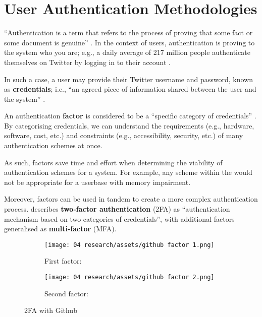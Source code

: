 \section{User Authentication Methodologies}

\enquote{Authentication is a term that refers to the
  process of proving that some fact or some document is
  genuine} \parencite{whatIsAuth}.
In the context of users, authentication is proving to the
system who you are; e.g., a daily average of 217 million
people authenticate themselves on Twitter by logging in to
their account \parencite[][Q4]{twitterUsage}.

In such a case, a user may provide their Twitter username
and password, known as \textbf{credentials}; i.e.,
\enquote{an agreed piece of information shared between the
  user and the system} \parencite{whatIsAuth}.

An authentication \textbf{factor} is considered to be a
\enquote{specific category of credentials}
\parencite{whatIsAuth}.
By categorising credentials, we can understand the
requirements (e.g., hardware, software, cost, etc.) and
constraints (e.g., accessibility, security, etc.) of many
authentication schemes at once.

As such, factors save time and effort when determining the
viability of authentication schemes for a system.
For example, any scheme within the
 would not be
appropriate for a userbase with memory impairment.

Moreover, factors can be used in tandem to create a more
complex authentication process.
\cite{whatIsAuth}
describes \textbf{two-factor authentication} (2FA) as
\enquote{authentication mechanism based on two categories
  of credentials}, with additional factors generalised as
\textbf{multi-factor} (MFA).

\begin{figure}[H]
  \centering
  \begin{subfigure}{0.49\linewidth}
    \centering
    \texttt{[image: 04
      research/assets/github factor 1.png]}
    \caption{First factor: }
  \end{subfigure}
  \begin{subfigure}{0.49\linewidth}
    \centering
    \texttt{[image: 04
      research/assets/github factor 2.png]}
    \caption{Second factor: }

  \end{subfigure}

  \caption{2FA with Github}
\end{figure}

